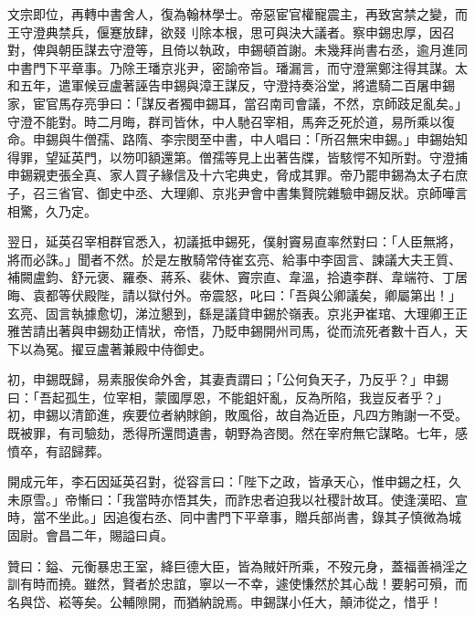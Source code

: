 \begin{pinyinscope}
 文宗即位，再轉中書舍人，復為翰林學士。帝惡宦官權寵震主，再致宮禁之變，而王守澄典禁兵，偃蹇放肆，欲叕刂除本根，思可與決大議者。察申錫忠厚，因召對，俾與朝臣謀去守澄等，且倚以執政，申錫頓首謝。未幾拜尚書右丞，逾月進同中書門下平章事。乃除王璠京兆尹，密諭帝旨。璠漏言，而守澄黨鄭注得其謀。太和五年，遣軍候豆盧著誣告申錫與漳王謀反，守澄持奏浴堂，將遣騎二百屠申錫家，宦官馬存亮爭曰：「謀反者獨申錫耳，當召南司會議，不然，京師跂足亂矣。」守澄不能對。時二月晦，群司皆休，中人馳召宰相，馬奔乏死於道，易所乘以復命。申錫與牛僧孺、路隋、李宗閔至中書，中人唱曰：「所召無宋申錫。」申錫始知得罪，望延英門，以笏叩額還第。僧孺等見上出著告牒，皆駭愕不知所對。守澄捕申錫親吏張全真、家人買子緣信及十六宅典史，脅成其罪。帝乃罷申錫為太子右庶子，召三省官、御史中丞、大理卿、京兆尹會中書集賢院雜驗申錫反狀。京師嘩言相驚，久乃定。



 翌日，延英召宰相群官悉入，初議抵申錫死，僕射竇易直率然對曰：「人臣無將，將而必誅。」聞者不然。於是左散騎常侍崔玄亮、給事中李固言、諫議大夫王質、補闕盧鈞、舒元褒、羅泰、蔣系、裴休、竇宗直、韋溫，拾遺李群、韋端符、丁居晦、袁都等伏殿陛，請以獄付外。帝震怒，叱曰：「吾與公卿議矣，卿屬第出！」玄亮、固言執據愈切，涕泣懇到，繇是議貸申錫於嶺表。京兆尹崔琯、大理卿王正雅苦請出著與申錫劾正情狀，帝悟，乃貶申錫開州司馬，從而流死者數十百人，天下以為冤。擢豆盧著兼殿中侍御史。



 初，申錫既歸，易素服俟命外舍，其妻責謂曰；「公何負天子，乃反乎？」申錫曰：「吾起孤生，位宰相，蒙國厚恩，不能鉏奸亂，反為所陷，我豈反者乎？」初，申錫以清節進，疾要位者納賕餉，敗風俗，故自為近臣，凡四方賄謝一不受。既被罪，有司驗劾，悉得所還問遺書，朝野為咨閔。然在宰府無它謀略。七年，感憤卒，有詔歸葬。



 開成元年，李石因延英召對，從容言曰：「陛下之政，皆承天心，惟申錫之枉，久未原雪。」帝慚曰：「我當時亦悟其失，而詐忠者迫我以社稷計故耳。使逢漢昭、宣時，當不坐此。」因追復右丞、同中書門下平章事，贈兵部尚書，錄其子慎微為城固尉。會昌二年，賜謚曰貞。



 贊曰：鎰、元衡暴忠王室，絳巨德大臣，皆為賊奸所乘，不歿元身，蓋福善禍淫之訓有時而撓。雖然，賢者於忠誼，寧以一不幸，遽使慊然於其心哉！要躬可殞，而名與岱、崧等矣。公輔隙開，而猶納說焉。申錫謀小任大，顛沛從之，惜乎！



\end{pinyinscope}